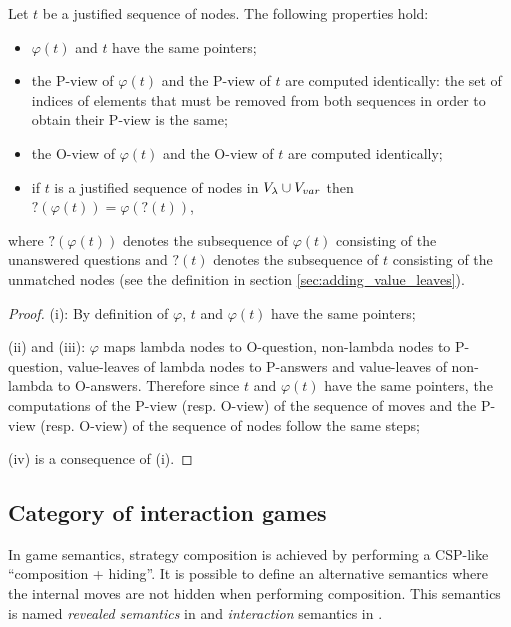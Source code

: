 \begin{property}
\label{proper:phi_pview} Let $t$ be a justified sequence of nodes. The following properties hold:
\begin{itemize}
\item[(i)] $\varphi(t)$ and $t$ have the same pointers;
\item[(ii)] the P-view of $\varphi(t)$ and the P-view of $t$ are computed
identically: the set of indices of elements that must be removed
from both sequences in order to obtain their P-view is the same;
\item[(iii)] the O-view of $\varphi(t)$ and the O-view of $t$ are computed identically;
\item[(iv)] if $t$ is a justified sequence of nodes in $V_\lambda \cup V_{var}$ then $?(\varphi(t)) =
\varphi(?(t))$,
\end{itemize}
where $?(\varphi(t))$ denotes the subsequence of $\varphi(t)$ consisting of the unanswered questions
and $?(t)$ denotes the subsequence of $t$ consisting of the unmatched nodes (see the
definition in section \ref{sec:adding_value_leaves}).
\end{property}
\begin{proof}
(i): By definition of $\varphi$, $t$ and $\varphi(t)$ have the same
pointers;

(ii) and (iii): $\varphi$ maps lambda nodes to O-question,
non-lambda nodes to P-question, value-leaves of lambda nodes to P-answers and
value-leaves of non-lambda to O-answers. Therefore since $t$ and $\varphi(t)$ have the
same pointers, the computations of the P-view (resp. O-view) of the
sequence of moves and the P-view (resp. O-view) of the sequence of
nodes follow the same steps;

(iv) is a consequence of (i).

\end{proof}


\subsection{Category of interaction games}
\label{sec:interaction_semantics}

In game semantics, strategy composition is achieved by performing a
CSP-like ``composition + hiding''. It is possible to define an
alternative semantics where the internal moves are not hidden when
performing composition. This semantics is named \emph{revealed semantics} in \cite{willgreenlandthesis} and \emph{interaction}
semantics in \cite{DBLP:conf/sas/DimovskiGL05}.

